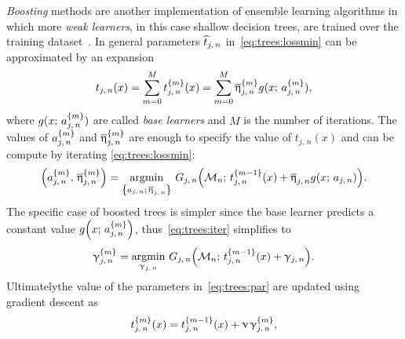 \textit{Boosting} methods are another implementation of ensemble learning algorithms in which more \textit{weak learners}, in this case shallow decision trees, are trained over the training dataset~\cite{Friedman:2001:GreedyFunctionApproximation, Friedman:2002:StochasticGradientBoosting}.
In general parameters $\widehat{t}_{j,\, n}$ in~\eqref{eq:trees:lossmin} can be approximated by an expansion
\begin{equation}
  t_{j,\, n}( x )
  =
  \sum\limits_{m = 0}^{M} t^{\qty{m}}_{j,\, n}( x )
  =
  \sum\limits_{m = 0}^{M} \overline{\upeta}^{\qty{m}}_{j,\, n} g( x;\, a^{\qty{m}}_{j,\, n} ),
  \label{eq:trees:par}
\end{equation}
where $g( x;\, a^{\qty{m}}_{j,\, n})$ are called \textit{base learners} and $M$ is the number of iterations.\footnotemark{}
The values of $a^{\qty{m}}_{j,\, n}$ and $\overline{\upeta}^{\qty{m}}_{j,\, n}$ are enough to specify the value of $t_{j,\, n}( x )$ and can be compute by iterating \eqref{eq:trees:lossmin}:
\begin{equation}
  \qty( a^{\qty{m}}_{j,\, n},\, \beta^{\qty{m}}_{j,\, n} )
  =
  \underset{\qty{a_{j,\, n};\, \beta_{j,\, n}}}{\mathrm{argmin}}~
  G_{j,\, n}\qty( \cM_n;\, t^{\qty{m-1}}_{j,\, n}( x ) + \beta_{j,\, n} g\qty( x;\, a_{j,\, n} ) ).
  \label{eq:trees:iter}
\end{equation}
The specific case of boosted trees is simpler since the base learner predicts a constant value $g\qty( x;\, a^{\qty{m}}_{j,\, n} )$, thus~\eqref{eq:trees:iter} simplifies to
\begin{equation}
  \upgamma^{\qty{m}}_{j,\, n}
  =
  \underset{\upgamma_{j,\, n}}{\mathrm{argmin}}~
  G_{j,\, n}\qty( \mathcal{M}_n;\, t^{\qty{m-1}}_{j,\, n}( x ) + \upgamma_{j,\, n} ).
\end{equation}
Ultimatelythe value of the parameters in~\eqref{eq:trees:par} are updated using gradient descent as
\begin{equation}
  t^{\qty{m}}_{j,\, n}( x )
  =
  t^{\qty{m-1}}_{j,\, n}( x ) + \upnu\, \upgamma_{j,\, n}^{\qty{m}},
\end{equation}
